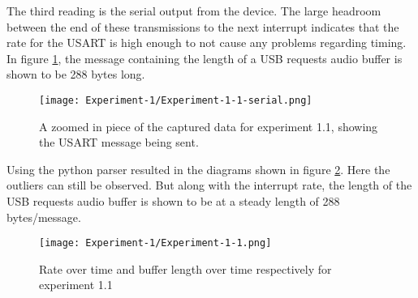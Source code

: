 The third reading is the serial output from the device. The large
headroom between the end of these transmissions to the next interrupt
indicates that the rate for the USART is high enough to not cause any
problems regarding timing. In figure \ref{fig:experiment-1-1-serial},
the message containing the length of a USB requests audio buffer is
shown to be 288 bytes long.

\begin{figure}[h]
	\caption{A zoomed in piece of the captured data for experiment
	1.1, showing the USART message being sent.}
	\centering
	\texttt{[image: Experiment-1/Experiment-1-1-serial.png]}
	\label{fig:experiment-1-1-serial}
\end{figure}

Using the python parser resulted in the diagrams shown in figure
\ref{fig:experiment-1-1}. Here the outliers can still be observed. But
along with the interrupt rate, the length of the USB requests audio
buffer is shown to be at a steady length of 288 bytes/message.

\begin{figure}[h]
	\caption{Rate over time and buffer length over time respectively
	for experiment 1.1}
	\centering
	\texttt{[image: Experiment-1/Experiment-1-1.png]}
	\label{fig:experiment-1-1}
\end{figure}
